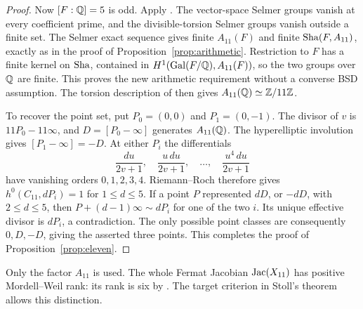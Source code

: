 \begin{proof}
Now $[F:\mathbb Q]=5$ is odd. Apply
\citet[Theorems B and B$'$, alternative (a), p.~593]{Nekovar2012}.
The vector-space Selmer groups vanish at every coefficient prime,
and the divisible-torsion Selmer groups vanish outside a finite set.
The Selmer exact sequence gives finite $A_{11}(F)$ and finite
$\operatorname{Sha}(F,A_{11})$, exactly as in the proof of
Proposition~\ref{prop:arithmetic}. Restriction to $F$ has a finite
kernel on $\operatorname{Sha}$, contained in
$H^1(\operatorname{Gal}(F/\mathbb Q),A_{11}(F))$, so the two groups over $\mathbb Q$ are finite.
This proves the new arithmetic requirement without a converse BSD
assumption. The torsion description of
\citet[Theorem 1.1]{GrossRohrlich1978} then gives
$A_{11}(\mathbb Q)\simeq\mathbb Z/11\mathbb Z$.

To recover the point set, put $P_0=(0,0)$ and $P_1=(0,-1)$.
The divisor of $v$ is $11P_0-11\infty$, and
$D=[P_0-\infty]$ generates $A_{11}(\mathbb Q)$.
The hyperelliptic involution gives $[P_1-\infty]=-D$.
At either $P_i$ the differentials
\[
\frac{du}{2v+1},\quad\frac{u\,du}{2v+1},\quad\ldots,
\quad\frac{u^4\,du}{2v+1}
\]
have vanishing orders $0,1,2,3,4$. Riemann--Roch therefore gives
$h^0(C_{11},dP_i)=1$ for $1\leq d\leq5$.
If a point $P$ represented $dD$, or $-dD$, with $2\leq d\leq5$,
then $P+(d-1)\infty\sim dP_i$ for one of the two $i$.
Its unique effective divisor is $dP_i$, a contradiction.
The only possible point classes are consequently $0,D,-D$, giving
the asserted three points. This completes the proof of
Proposition~\ref{prop:eleven}.
\end{proof}

\begin{remark}\label{rem:eleven-factor-only}
Only the factor $A_{11}$ is used. The whole Fermat Jacobian
$\operatorname{Jac}(X_{11})$ has positive Mordell--Weil rank: its rank is six by
\citet[Introduction and \S4]{GrossRohrlich1978}.
The target criterion in Stoll's theorem allows this distinction.
\end{remark}
